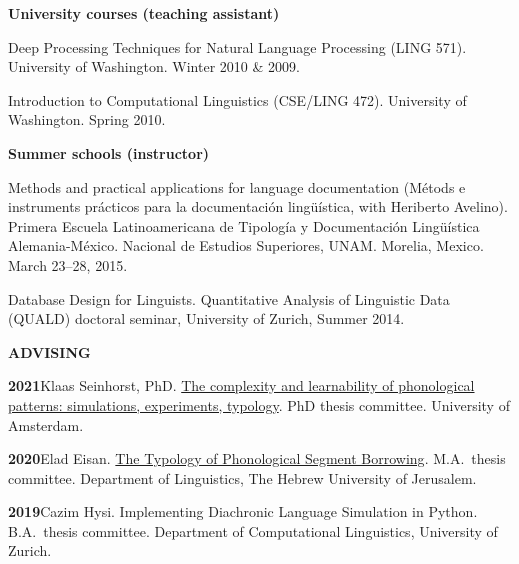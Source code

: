 \documentclass[11pt]{article}
\newcommand{\hangpara}{
 \setlength{\parindent}{0in} %
 \hangindent=0.42in %
}
\begin{document}
\begin{flushleft}
{\bf University courses (teaching assistant)}
\end{flushleft}
\hangpara Deep Processing Techniques for Natural Language Processing (LING 571). University of Washington. Winter 2010 \& 2009.

\vskip 6pt
\hangpara %
Introduction to Computational Linguistics (CSE/LING 472). University of Washington. Spring 2010.

\begin{flushleft}
{\bf Summer schools (instructor)}
\end{flushleft}
\hangpara Methods and practical applications for language documentation (M{\'e}tods e instruments pr{\'a}cticos para la documentaci{\'o}n ling{\"u}{\'i}stica, with Heriberto Avelino). Primera Escuela Latinoamericana de Tipolog{\'i}a y Documentaci{\'o}n Ling{\"u}{\'i}stica Alemania-M{\'e}xico. Nacional de Estudios Superiores, UNAM. Morelia, Mexico. March 23--28, 2015.

\vskip 6pt
\hangpara Database Design for Linguists. Quantitative Analysis of Linguistic Data (QUALD) doctoral seminar, University of Zurich, Summer 2014.

\vskip 20pt
\begin{flushleft}
{\bf ADVISING}
\end{flushleft}

\hangpara
{\bf 2021}\hspace{1ex}Klaas Seinhorst, PhD. \href{https://www.fon.hum.uva.nl/klaas/KlaasSeinhorstDissertation.pdf}{The complexity and learnability of phonological patterns: simulations, experiments, typology}. PhD thesis committee. University of Amsterdam.

\hangpara
\vskip 6pt
{\bf 2020}\hspace{1ex}Elad Eisan. \href{https://www.researchgate.net/publication/341734023_The_Typology_of_Phonological_Segment_Borrowing}{
The Typology of Phonological Segment Borrowing}. M.A.\ thesis committee. Department of Linguistics, The Hebrew University of Jerusalem.

\hangpara
\vskip 6pt
{\bf 2019}\hspace{1ex}Cazim Hysi. Implementing Diachronic Language Simulation in Python. B.A.\ thesis committee. Department of Computational Linguistics, University of Zurich.
\end{document}
